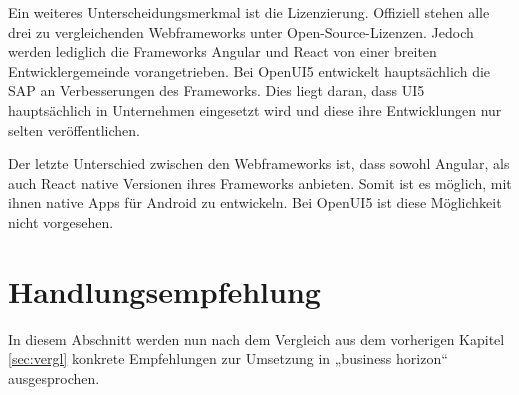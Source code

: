 Ein weiteres Unterscheidungsmerkmal ist die Lizenzierung. Offiziell stehen alle drei zu vergleichenden Webframeworks unter Open-Source-Lizenzen. Jedoch werden lediglich die Frameworks Angular und React von einer breiten Entwicklergemeinde vorangetrieben. Bei OpenUI5 entwickelt hauptsächlich die SAP an Verbesserungen des Frameworks. Dies liegt daran, dass UI5 hauptsächlich in Unternehmen eingesetzt wird und diese ihre Entwicklungen nur selten veröffentlichen. 

Der letzte Unterschied zwischen den Webframeworks ist, dass sowohl Angular, als auch React native Versionen ihres Frameworks anbieten. Somit ist es möglich, mit ihnen native Apps für Android zu entwickeln. Bei OpenUI5 ist diese Möglichkeit nicht vorgesehen.


\section{Handlungsempfehlung}\label{sec:empf}

In diesem Abschnitt werden nun nach dem Vergleich aus dem vorherigen Kapitel \ref{sec:vergl} konkrete Empfehlungen zur Umsetzung in „business horizon“ ausgesprochen.

